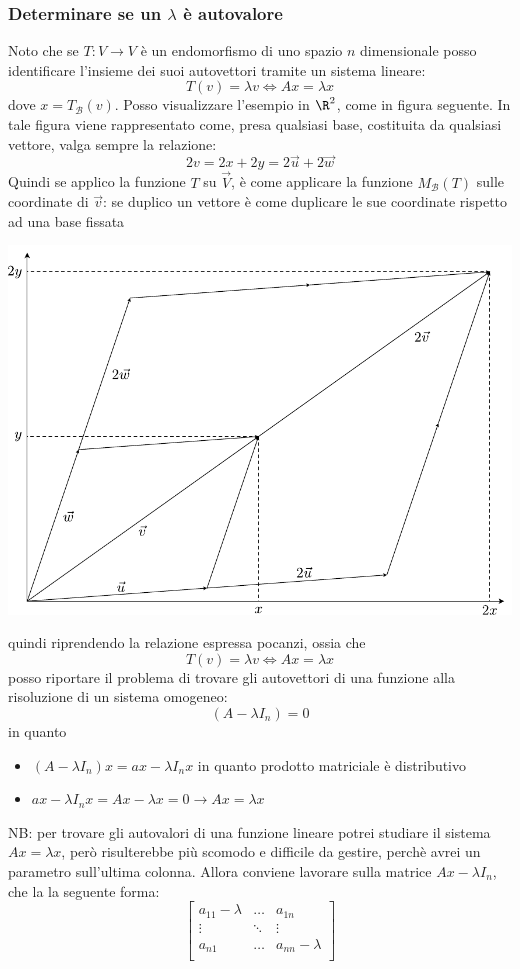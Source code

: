\subsubsection*{Determinare se un $ \lambda  $ è autovalore}
Noto che se $ T : V \to V $ è un endomorfismo di uno spazio $ n $ dimensionale posso identificare l'insieme dei suoi autovettori tramite un sistema lineare:
\[
	T\left( v \right) = \lambda  v \Leftrightarrow A x = \lambda x
\]
dove $ x= T_{ \mathcal{B}}\left( v \right)  $. Posso visualizzare l'esempio in $ \R^{2} $, come in figura seguente. In tale figura viene rappresentato come, presa qualsiasi base, costituita da qualsiasi vettore, valga sempre la relazione:
\[
	2v= 2 x + 2y = 2 \vec{u} + 2 \vec{w}
\]
Quindi se applico la funzione $ T $ su $ \vec{V}  $, è come applicare la funzione $M_{ \mathcal{B}  }\left( T \right) $ sulle coordinate di $ \vec{v}  $: se duplico un vettore è come duplicare le sue coordinate rispetto ad una base fissata
\begin{center}
	\includegraphics{Images/DetAutovalore.pdf}
\end{center}
quindi riprendendo la relazione espressa pocanzi, ossia che
\[
	T\left( v \right)  = \lambda v \Leftrightarrow Ax = \lambda x
\]
posso riportare il problema di trovare gli autovettori di una funzione alla risoluzione di un sistema omogeneo:
\[
	\left( A- \lambda  I_n \right) =0
\]
in quanto
\begin{itemize}
	\item $ \left( A- \lambda  I_n \right) x = ax - \lambda I_nx $ in quanto prodotto matriciale è distributivo
	\item $  ax - \lambda I_nx = Ax - \lambda x =0 \rightarrow Ax = \lambda  x$
\end{itemize}
\vskip3mm
NB: per trovare gli autovalori di una funzione lineare potrei studiare il sistema $ Ax = \lambda  x $, però risulterebbe più scomodo e difficile da gestire, perchè avrei un parametro sull'ultima colonna. Allora conviene lavorare sulla matrice $ Ax-\lambda I_n $, che la la seguente forma:
\[
	\begin{bmatrix}
		a_{11}-\lambda & \ldots & a_{1n}         \\
		\vdots         & \ddots & \vdots         \\
		a_{n1}         & \ldots & a_{nn}-\lambda \\
	\end{bmatrix}
\]

